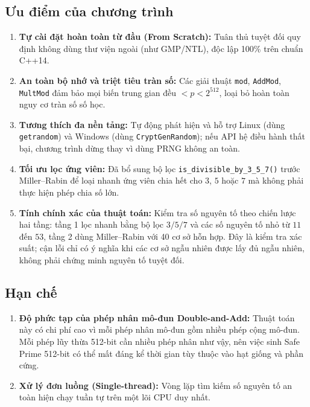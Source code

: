 \documentclass[12pt,a4paper]{article}
\theoremstyle{plain}
\begin{document}
\subsection{Ưu điểm của chương trình}
\begin{enumerate}
    \item \textbf{Tự cài đặt hoàn toàn từ đầu (From Scratch):} Tuân thủ tuyệt đối quy định không dùng thư viện ngoài (như GMP/NTL), độc lập 100\% trên chuẩn C++14.
    \item \textbf{An toàn bộ nhớ và triệt tiêu tràn số:} Các giải thuật \texttt{mod}, \texttt{AddMod}, \texttt{MultMod} đảm bảo mọi biến trung gian đều $< p < 2^{512}$, loại bỏ hoàn toàn nguy cơ tràn số số học.
    \item \textbf{Tương thích đa nền tảng:} Tự động phát hiện và hỗ trợ Linux (dùng \texttt{getrandom}) và Windows (dùng \texttt{CryptGenRandom}); nếu API hệ điều hành thất bại, chương trình dừng thay vì dùng PRNG không an toàn.
    \item \textbf{Tối ưu lọc ứng viên:} Đã bổ sung bộ lọc \texttt{is\_divisible\_by\_3\_5\_7()} trước Miller--Rabin để loại nhanh ứng viên chia hết cho $3$, $5$ hoặc $7$ mà không phải thực hiện phép chia số lớn.
    \item \textbf{Tính chính xác của thuật toán:} Kiểm tra số nguyên tố theo chiến lược hai tầng: tầng 1 lọc nhanh bằng bộ lọc $3/5/7$ và các số nguyên tố nhỏ từ $11$ đến $53$, tầng 2 dùng Miller--Rabin với 40 cơ sở hỗn hợp. Đây là kiểm tra xác suất; cận lỗi chỉ có ý nghĩa khi các cơ sở ngẫu nhiên được lấy đủ ngẫu nhiên, không phải chứng minh nguyên tố tuyệt đối.
\end{enumerate}

\subsection{Hạn chế}
\begin{enumerate}
    \item \textbf{Độ phức tạp của phép nhân mô-đun Double-and-Add:} Thuật toán này có chi phí cao vì mỗi phép nhân mô-đun gồm nhiều phép cộng mô-đun. Mỗi phép lũy thừa 512-bit cần nhiều phép nhân như vậy, nên việc sinh Safe Prime 512-bit có thể mất đáng kể thời gian tùy thuộc vào hạt giống và phần cứng.
    \item \textbf{Xử lý đơn luồng (Single-thread):} Vòng lặp tìm kiếm số nguyên tố an toàn hiện chạy tuần tự trên một lõi CPU duy nhất.
\end{enumerate}
\end{document}

